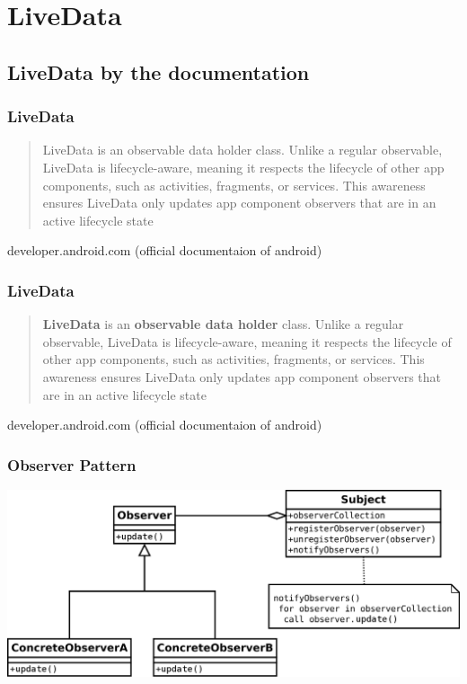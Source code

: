 \documentclass{beamer}
\begin{document}
	\section[Live Data]{LiveData}
	\subsection[LiveData Docs]{LiveData by the documentation}
	\begin{frame}
		\frametitle{LiveData}
\begin{quote}LiveData is an observable data holder class. Unlike a regular observable, LiveData is lifecycle-aware, meaning it respects the lifecycle of other app components, such as activities, fragments, or services. This awareness ensures LiveData only updates app component observers that are in an active lifecycle state\end{quote} developer.android.com \linebreak(official documentaion of android)
	\end{frame}
	
	\begin{frame}
		\frametitle{LiveData}
		\begin{quote}\textbf{LiveData} is an \textbf{observable data holder} class. Unlike a regular observable, LiveData is lifecycle-aware, meaning it respects the lifecycle of other app components, such as activities, fragments, or services. This awareness ensures LiveData only updates app component observers that are in an active lifecycle state\end{quote} developer.android.com \linebreak(official documentaion of android)
	\end{frame}

	\begin{frame}
	\frametitle{Observer Pattern}
	\includegraphics[width=1\textwidth]{observerpattern.png}
	\end{frame}
	
\end{document}
